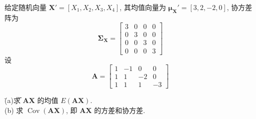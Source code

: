 \medskip
{}\quad 给定随机向量 $\mathbf{X}'=[X_{1},X_{2},X_{3},X_{4}]$, 其均值向量为 $\boldsymbol{\mu}_{\mathbf{X}}'=[3,2,-2,0]$, 协方差阵为
\[
\boldsymbol{\Sigma}_{\mathbf{X}}=\begin{bmatrix}3&0&0&0\\0&3&0&0\\0&0&3&0\\0&0&0&3\end{bmatrix}
\]
设
\[
\mathbf{A}=\begin{bmatrix}1&-1&0&0\\1&1&-2&0\\1&1&1&-3\end{bmatrix}
\]
\begin{tabbing}
\hspace*{2em}\=(a)\quad \= 求 $\mathbf{A}\mathbf{X}$ 的均值 $E(\mathbf{A}\mathbf{X})$.\\[2pt]
\>(b)\> 求 $\operatorname{Cov}(\mathbf{A}\mathbf{X})$, 即 $\mathbf{A}\mathbf{X}$ 的方差和协方差.
\end{tabbing}
